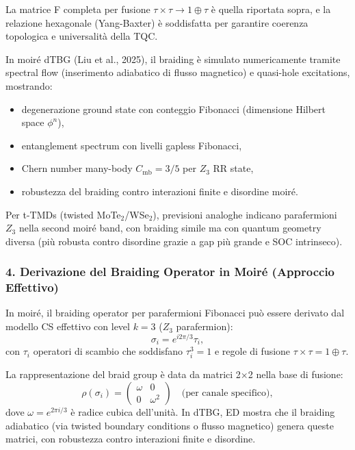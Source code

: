 \documentclass[11pt,a4paper]{article}
\theoremstyle{plain}
\theoremstyle{definition}
\begin{document}
La matrice F completa per fusione $\tau \times \tau \to 1 \oplus \tau$ è quella riportata sopra, e la relazione hexagonale (Yang-Baxter) è soddisfatta per garantire coerenza topologica e universalità della TQC.

In moiré dTBG (Liu et al., 2025), il braiding è simulato numericamente tramite spectral flow (inserimento adiabatico di flusso magnetico) e quasi-hole excitations, mostrando:
\begin{itemize}
    \item degenerazione ground state con conteggio Fibonacci (dimensione Hilbert space $\phi^n$),
    \item entanglement spectrum con livelli gapless Fibonacci,
    \item Chern number many-body $C_{\mathrm{mb}} = 3/5$ per $Z_3$ RR state,
    \item robustezza del braiding contro interazioni finite e disordine moiré.
\end{itemize}

Per t-TMDs (twisted MoTe$_2$/WSe$_2$), previsioni analoghe indicano parafermioni $Z_3$ nella second moiré band, con braiding simile ma con quantum geometry diversa (più robusta contro disordine grazie a gap più grande e SOC intrinseco).

\subsubsection{4. Derivazione del Braiding Operator in Moiré (Approccio Effettivo)}

In moiré, il braiding operator per parafermioni Fibonacci può essere derivato dal modello CS effettivo con level $k=3$ ($Z_3$ parafermion):
\begin{equation}
\sigma_i = e^{i 2\pi / 3} \tau_i,
\end{equation}
con $\tau_i$ operatori di scambio che soddisfano $\tau_i^3 = 1$ e regole di fusione $\tau \times \tau = 1 \oplus \tau$.

La rappresentazione del braid group è data da matrici 2×2 nella base di fusione:
\begin{equation}
\rho(\sigma_i) = \begin{pmatrix}
\omega & 0 \\
0 & \omega^2
\end{pmatrix} \quad \text{(per canale specifico)},
\end{equation}
dove $\omega = e^{2\pi i / 3}$ è radice cubica dell'unità. In dTBG, ED mostra che il braiding adiabatico (via twisted boundary conditions o flusso magnetico) genera queste matrici, con robustezza contro interazioni finite e disordine.
\end{document}
